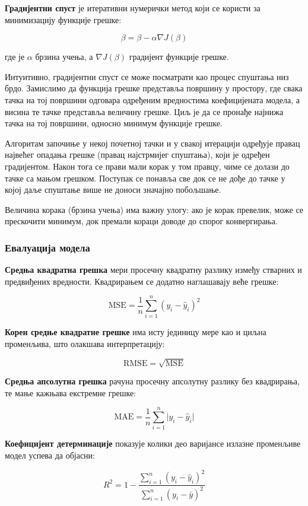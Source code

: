\textbf{Градијентни спуст} је итеративни нумерички метод који се користи за минимизацију функције грешке:

\[
\beta = \beta - \alpha \nabla J(\beta)
\]

где је $\alpha$ брзина учења, а $\nabla J(\beta)$ градијент функције грешке.

Интуитивно, градијентни спуст се може посматрати као процес спуштања низ брдо. Замислимо да функција грешке представља површину у простору, где свака тачка на тој површини одговара одређеним вредностима коефицијената модела, а висина те тачке представља величину грешке. Циљ је да се пронађе најнижа тачка на тој површини, односно минимум функције грешке.

Алгоритам започиње у некој почетној тачки и у свакој итерацији одређује правац највећег опадања грешке (правац најстрмијег спуштања), који је одређен градијентом. Након тога се прави мали корак у том правцу, чиме се долази до тачке са мањом грешком. Поступак се понавља све док се не дође до тачке у којој даље спуштање више не доноси значајно побољшање.

Величина корака (брзина учења) има важну улогу: ако је корак превелик, може се прескочити минимум, док премали кораци доводе до спорог конвергирања.

\subsubsection{Евалуација модела}
\textbf{Средња квадратна грешка} мери просечну квадратну разлику између стварних и предвиђених вредности. Квадрирањем се додатно наглашавају веће грешке:

\[
\mathrm{MSE} = \frac{1}{n} \sum_{i=1}^{n} (y_{i} - \hat{y}_{i})^{2}
\]

\textbf{Корен средње квадратне грешке} има исту јединицу мере као и циљна променљива, што олакшава интерпретацију:

\[
\mathrm{RMSE} = \sqrt{\mathrm{MSE}}
\]

\textbf{Средња апсолутна грешка} рачуна просечну апсолутну разлику без квадрирања, те мање кажњава екстремне грешке:

\[
\mathrm{MAE} = \frac{1}{n} \sum_{i=1}^{n} \vert y_{i} - \hat{y}_{i} \vert
\]

\textbf{Коефицијент детерминације} показује колики део варијансе излазне променљиве модел успева да објасни:

\[
R^{2} = 1 - \frac{\sum_{i=1}^{n} (y_{i} - \hat{y}_{i})^{2}}{\sum_{i=1}^{n} (y_{i} - \bar{y})^{2}}
\]

